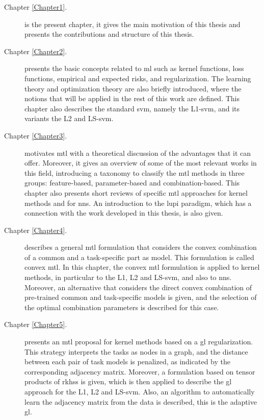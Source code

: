 \begin{description}

\item [{Chapter \ref{Chapter1}}. ] is the present chapter, it gives the main motivation of this thesis and presents the contributions and structure of this thesis.

\item [{Chapter \ref{Chapter2}}. ] presents the basic concepts related to \acrshort{ml} such as kernel functions, loss functions, empirical and expected risks, and regularization. The learning theory and optimization theory are also briefly introduced, where the notions that will be applied in the rest of this work are defined. This chapter also describes the standard \acrshort{svm}, namely the L1-\acrshort{svm}, and its variants the L2 and LS-\acrshort{svm}.

\item [{Chapter \ref{Chapter3}}. ] motivates \acrshort{mtl} with a theoretical discussion of the advantages that it can offer. Moreover, it gives an overview of some of the most relevant works in this field, introducing a taxonomy to classify the \acrshort{mtl} methods in three groups: feature-based, parameter-based and combination-based. This chapter also presents short reviews of specific \acrshort{mtl} approaches for kernel methods and for \acrshort{nns}. An introduction to the \acrfull{lupi} paradigm, which has a connection with the work developed in this thesis, is also given. 

\item [{ Chapter \ref{Chapter4}}. ] describes a general \acrshort{mtl} formulation that considers the convex combination of a common and a task-specific part as model. This formulation is called convex \acrshort{mtl}. In this chapter, the convex \acrshort{mtl} formulation is applied to kernel methods, in particular to the L1, L2 and LS-\acrshort{svm}, and also to \acrshort{nns}. Moreover, an alternative that considers the direct convex combination of pre-trained common and task-specific models is given, and the selection of the optimal combination parameters is described for this case.

\item [{ Chapter \ref{Chapter5}}. ] presents an \acrshort{mtl} proposal for kernel methods based on a \acrfull{gl} regularization. This strategy interprets the tasks as nodes in a graph, and the distance between each pair of task models is penalized, as indicated by the corresponding adjacency matrix. Moreover, a formulation based on tensor products of \acrfull{rkhss} is given, which is then applied to describe the \acrshort{gl} approach for the L1, L2 and LS-\acrshort{svm}. Also, an algorithm to automatically learn the adjacency matrix from the data is described, this is the adaptive \acrshort{gl}. 


\end{description}
